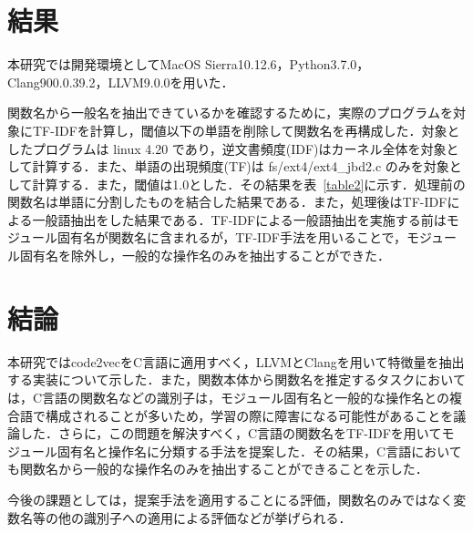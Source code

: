 \documentclass[submit,techrep,noauthor]{ipsj}
\begin{document}
\section{結果}
本研究では開発環境としてMacOS Sierra10.12.6，Python3.7.0，Clang900.0.39.2，LLVM9.0.0を用いた．

関数名から一般名を抽出できているかを確認するために，実際のプログラムを対象にTF-IDFを計算し，閾値以下の単語を削除して関数名を再構成した．対象としたプログラムは linux 4.20 であり，逆文書頻度(IDF)はカーネル全体を対象として計算する．また、単語の出現頻度(TF)は fs/ext4/ext4\_jbd2.c のみを対象として計算する．また，閾値は1.0とした．その結果を表~\ref{table2}に示す．処理前の関数名は単語に分割したものを結合した結果である．また，処理後はTF-IDFによる一般語抽出をした結果である．TF-IDFによる一般語抽出を実施する前はモジュール固有名が関数名に含まれるが，TF-IDF手法を用いることで，モジュール固有名を除外し，一般的な操作名のみを抽出することができた．

\section{結論}
本研究ではcode2vecをC言語に適用すべく，LLVMとClang\cite{lattner2007clang}を用いて特徴量を抽出する実装について示した．また，関数本体から関数名を推定するタスクにおいては，C言語の関数名などの識別子は，モジュール固有名と一般的な操作名との複合語で構成されることが多いため，学習の際に障害になる可能性があることを議論した．さらに，この問題を解決すべく，C言語の関数名をTF-IDFを用いてモジュール固有名と操作名に分類する手法を提案した．その結果，C言語においても関数名から一般的な操作名のみを抽出することができることを示した．

今後の課題としては，提案手法を適用することにる評価，関数名のみではなく変数名等の他の識別子への適用による評価などが挙げられる．




\end{document}
